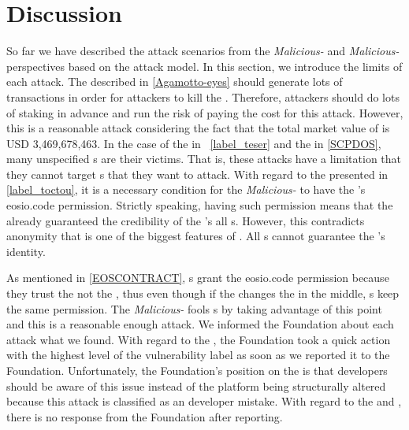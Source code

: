 \chapter{Discussion}


So far we have described the attack scenarios from the \textit{Malicious-\SCP} and \textit{Malicious-\User} perspectives based on the attack model. 
In this section, we introduce the limits of each attack. 
The \NODEDOS described in \autoref{Agamotto-eyes} should generate lots of transactions in order for attackers to kill the \BP. Therefore, attackers should do lots of \EOSCPU staking in advance and run the risk of paying the cost for this attack. 
However, this is a reasonable attack considering the fact that the total market value of \EOS is USD 3,469,678,463. 
In the case of the \TESER in ~\autoref{label_teser} and the \SCPDOS in \autoref{SCPDOS}, many unspecified {\SC}s are their victims. That is, these attacks have a limitation that they cannot target {\SC}s that they want to attack. 
With regard to the \TOCTOU presented in \autoref{label_toctou}, it is a necessary condition for the \textit{Malicious-\SCP} to have the \user’s eosio.code permission. 
Strictly speaking, having such permission means that the \user already guaranteed the credibility of the \SCP’s all {\SC}s. 
However, this contradicts anonymity that is one of the biggest features of \BLOCKCHAIN. 
All {\user}s cannot guarantee the \SCP’s identity.

As mentioned in \autoref{EOSCONTRACT}, {\user}s grant the eosio.code permission because they trust the \SCP not the \SC, thus even though if the \SCP changes the \SC in the middle, {\user}s keep the same permission. The \textit{Malicious-\SCP} fools {\user}s by taking advantage of this point and this is a reasonable enough attack. 
We informed the \PLATFORM Foundation about each attack what we found. With regard to the \NODEDOS, the \PLATFORM Foundation took a quick action with the highest level of the vulnerability label as soon as we reported it to the Foundation. 
Unfortunately, the \PLATFORM Foundation’s position on the \SCPDOS is that developers should be aware of this issue instead of the platform being structurally altered because this attack is classified as an \SC developer mistake.  With regard to the \TESER  and \SCPDOS, there is no response from the Foundation after reporting.
